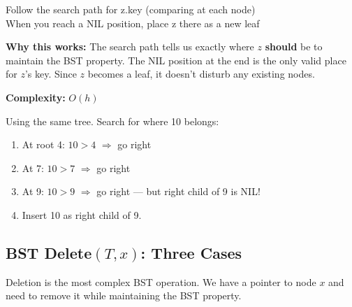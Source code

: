 \documentclass[11pt]{article}
\begin{document}
\begin{codebox}[Insert(T, z)]
\ttfamily Follow the search path for z.key (comparing at each node)\\
\ttfamily When you reach a NIL position, place z there as a new leaf
\end{codebox}

\textbf{Why this works:} The search path tells us exactly where $z$ \textbf{should} be to maintain the BST property. The NIL position at the end is the only valid place for $z$'s key. Since $z$ becomes a leaf, it doesn't disturb any existing nodes.

\textbf{Complexity:} \textcolor{greenO}{$O(h)$}

\begin{examplebox}
Using the same tree. Search for where 10 belongs:

\begin{enumerate}[leftmargin=1.4em,itemsep=1pt]
    \item At root 4: $10 > 4$ $\Rightarrow$ go right
    \item At 7: $10 > 7$ $\Rightarrow$ go right
    \item At 9: $10 > 9$ $\Rightarrow$ go right — but right child of 9 is NIL!
    \item \textcolor{greenO}{Insert 10 as right child of 9.}
\end{enumerate}

\begin{center}
\end{center}
\end{examplebox}

\subsection{BST Delete$(T, x)$: Three Cases}

Deletion is the most complex BST operation. We have a pointer to node $x$ and need to remove it while maintaining the BST property.
\end{document}

